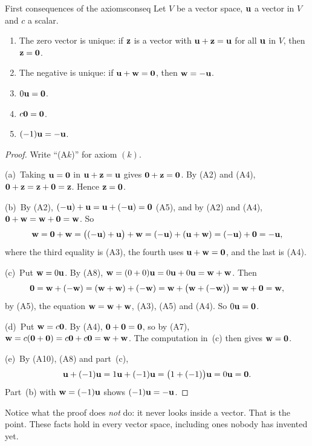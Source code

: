 \documentclass[11pt]{article}
\begin{document}
\begin{thm}{First consequences of the axioms}{conseq}
Let $V$ be a vector space, $\mathbf{u}$ a vector in $V$ and $c$ a scalar.
\begin{enumerate}[label=(\alph*),itemsep=1pt]
  \item The zero vector is unique: if $\mathbf{z}$ is a vector with $\mathbf{u}+\mathbf{z}=\mathbf{u}$ for all $\mathbf{u}$ in $V$, then $\mathbf{z}=\mathbf{0}$.
  \item The negative is unique: if $\mathbf{u}+\mathbf{w}=\mathbf{0}$, then $\mathbf{w}=-\mathbf{u}$.
  \item $0\mathbf{u}=\mathbf{0}$.
  \item $c\mathbf{0}=\mathbf{0}$.
  \item $(-1)\mathbf{u}=-\mathbf{u}$.
\end{enumerate}
\end{thm}

\begin{proof}
Write ``(A$k$)'' for axiom $(k)$.

(a)~Taking $\mathbf{u}=\mathbf{0}$ in $\mathbf{u}+\mathbf{z}=\mathbf{u}$ gives $\mathbf{0}+\mathbf{z}=\mathbf{0}$. By (A2) and (A4), $\mathbf{0}+\mathbf{z}=\mathbf{z}+\mathbf{0}=\mathbf{z}$. Hence $\mathbf{z}=\mathbf{0}$.

(b)~By (A2), $(-\mathbf{u})+\mathbf{u}=\mathbf{u}+(-\mathbf{u})=\mathbf{0}$ (A5), and by (A2) and (A4), $\mathbf{0}+\mathbf{w}=\mathbf{w}+\mathbf{0}=\mathbf{w}$. So
\[
\mathbf{w}=\mathbf{0}+\mathbf{w}=\bigl((-\mathbf{u})+\mathbf{u}\bigr)+\mathbf{w}=(-\mathbf{u})+(\mathbf{u}+\mathbf{w})=(-\mathbf{u})+\mathbf{0}=-\mathbf{u},
\]
where the third equality is (A3), the fourth uses $\mathbf{u}+\mathbf{w}=\mathbf{0}$, and the last is (A4).

(c)~Put $\mathbf{w}=0\mathbf{u}$. By (A8), $\mathbf{w}=(0+0)\mathbf{u}=0\mathbf{u}+0\mathbf{u}=\mathbf{w}+\mathbf{w}$. Then
\[
\mathbf{0}=\mathbf{w}+(-\mathbf{w})=(\mathbf{w}+\mathbf{w})+(-\mathbf{w})=\mathbf{w}+\bigl(\mathbf{w}+(-\mathbf{w})\bigr)=\mathbf{w}+\mathbf{0}=\mathbf{w},
\]
by (A5), the equation $\mathbf{w}=\mathbf{w}+\mathbf{w}$, (A3), (A5) and (A4). So $0\mathbf{u}=\mathbf{0}$.

(d)~Put $\mathbf{w}=c\mathbf{0}$. By (A4), $\mathbf{0}+\mathbf{0}=\mathbf{0}$, so by (A7), $\mathbf{w}=c(\mathbf{0}+\mathbf{0})=c\mathbf{0}+c\mathbf{0}=\mathbf{w}+\mathbf{w}$. The computation in~(c) then gives $\mathbf{w}=\mathbf{0}$.

(e)~By (A10), (A8) and part~(c),
\[
\mathbf{u}+(-1)\mathbf{u}=1\mathbf{u}+(-1)\mathbf{u}=\bigl(1+(-1)\bigr)\mathbf{u}=0\mathbf{u}=\mathbf{0}.
\]
Part~(b) with $\mathbf{w}=(-1)\mathbf{u}$ shows $(-1)\mathbf{u}=-\mathbf{u}$.
\end{proof}

Notice what the proof does \emph{not} do: it never looks inside a vector. That is the point. These facts hold in every vector space, including ones nobody has invented yet.
\end{document}
